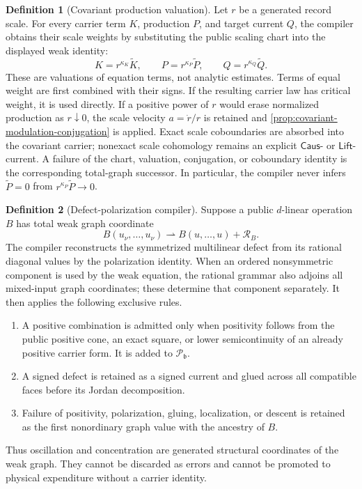 \documentclass[11pt]{article}
\numberwithin{section}{part}
\theoremstyle{plain}
\theoremstyle{definition}
\newtheorem{definition}[definition]{Definition}
\theoremstyle{remark}
\newcommand{\Caus}{\mathsf{Caus}}
\newcommand{\Lift}{\mathsf{Lift}}
\begin{document}
\begin{definition}[Covariant production valuation]
\label{def:covariant-production-valuation}
Let \(r\) be a generated record scale.  For every carrier term \(K\),
production \(P\), and target current \(Q\), the compiler obtains their scale
weights by substituting the public scaling chart into the displayed weak
identity:
\[
 K=r^{\kappa_K}\widetilde K,
 \qquad P=r^{\kappa_P}\widetilde P,
 \qquad Q=r^{\kappa_Q}\widetilde Q.
\]
These are valuations of equation terms, not analytic estimates.  Terms of
equal weight are first combined with their signs.  If the resulting carrier
law has critical weight, it is used directly.  If a positive power of \(r\)
would erase normalized production as \(r\downarrow0\), the scale velocity
\(a=\dot r/r\) is retained and
\cref{prop:covariant-modulation-conjugation} is applied.  Exact scale
coboundaries are absorbed into the covariant carrier; nonexact scale
cohomology remains an explicit \(\Caus\)- or \(\Lift\)-current.  A failure of
the chart, valuation, conjugation, or coboundary identity is the corresponding
total-graph successor.  In particular, the compiler never infers
\(\widetilde P=0\) from \(r^{\kappa_P}\widetilde P\to0\).
\end{definition}

\begin{definition}[Defect-polarization compiler]
\label{def:defect-polarization-compiler}
Suppose a public \(d\)-linear operation \(B\) has total weak graph coordinate
\[
 B(u_\nu,\ldots,u_\nu)\rightharpoonup
 B(u,\ldots,u)+\mathcal R_B.
\]
The compiler reconstructs the symmetrized multilinear defect from its
rational diagonal values by the polarization identity.  When an ordered
nonsymmetric component is used by the weak equation, the rational grammar
also adjoins all mixed-input graph coordinates; these determine that
component separately.  It then applies the following exclusive rules.
\begin{enumerate}[label=\textup{(D\arabic*)}]
\item A positive combination is admitted only when positivity follows from
the public positive cone, an exact square, or lower semicontinuity of an
already positive carrier form.  It is added to
\(\mathscr P_{\mathfrak b}\).
\item A signed defect is retained as a signed current and glued across all
compatible faces before its Jordan decomposition.
\item Failure of positivity, polarization, gluing, localization, or descent
is retained as the first nonordinary graph value with the ancestry of \(B\).
\end{enumerate}
Thus oscillation and concentration are generated structural coordinates of
the weak graph.  They cannot be discarded as errors and cannot be promoted
to physical expenditure without a carrier identity.
\end{definition}
\end{document}
